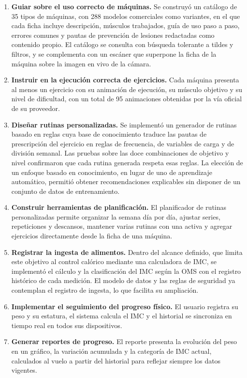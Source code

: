 \begin{enumerate}[label=\textbf{OE\arabic*.}, leftmargin=3.2em]
    \item \textbf{Guiar sobre el uso correcto de máquinas.} Se construyó un
    catálogo de 35 tipos de máquinas, con 288 modelos comerciales como
    variantes, en el que cada ficha incluye descripción, músculos trabajados,
    guía de uso paso a paso, errores comunes y pautas de prevención de
    lesiones redactadas como contenido propio. El catálogo se consulta con
    búsqueda tolerante a tildes y filtros, y se complementa con un escáner que
    superpone la ficha de la máquina sobre la imagen en vivo de la cámara.
    \item \textbf{Instruir en la ejecución correcta de ejercicios.} Cada
    máquina presenta al menos un ejercicio con su animación de ejecución, su
    músculo objetivo y su nivel de dificultad, con un total de 95 animaciones
    obtenidas por la vía oficial de su proveedor.
    \item \textbf{Diseñar rutinas personalizadas.} Se implementó un generador
    de rutinas basado en reglas cuya base de conocimiento traduce las pautas
    de prescripción del ejercicio en reglas de frecuencia, de variables de
    carga y de división semanal. Las pruebas sobre las doce combinaciones de
    objetivo y nivel confirmaron que cada rutina generada respeta esas reglas.
    La elección de un enfoque basado en conocimiento, en lugar de uno de
    aprendizaje automático, permitió obtener recomendaciones explicables sin
    disponer de un conjunto de datos de entrenamiento.
    \item \textbf{Construir herramientas de planificación.} El planificador
    de rutinas personalizadas permite organizar la semana día por día, ajustar
    series, repeticiones y descansos, mantener varias rutinas con una activa y
    agregar ejercicios directamente desde la ficha de una máquina.
    \item \textbf{Registrar la ingesta de alimentos.} Dentro del alcance
    definido, que limita este objetivo al control calórico mediante una
    calculadora de IMC, se implementó el cálculo y la clasificación del IMC
    según la OMS con el registro histórico de cada medición. El modelo de
    datos y las reglas de seguridad ya contemplan el registro de ingesta, lo
    que facilita su ampliación.
    \item \textbf{Implementar el seguimiento del progreso físico.} El usuario
    registra su peso y su estatura, el sistema calcula el IMC y el historial
    se sincroniza en tiempo real en todos sus dispositivos.
    \item \textbf{Generar reportes de progreso.} El reporte presenta la
    evolución del peso en un gráfico, la variación acumulada y la categoría de
    IMC actual, calculados al vuelo a partir del historial para reflejar
    siempre los datos vigentes.
\end{enumerate}

